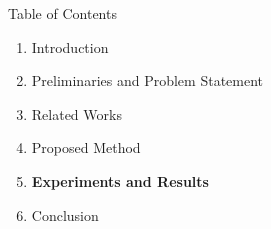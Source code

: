 \documentclass[aspectratio=169,9pt]{beamer}
\begin{document}
\begin{frame}{Table of Contents}
  \vspace{0.4cm}
  \begin{enumerate}[\bfseries 1]
    \setlength{\itemsep}{0.35cm}
    \item \color{gray} Introduction
    \item \color{gray} Preliminaries and Problem Statement
    \item \color{gray} Related Works
    \item \color{gray} Proposed Method
    \item \textbf{\color{bkblue} Experiments and Results}
    \item \color{gray} Conclusion
  \end{enumerate}
\end{frame}
\end{document}
